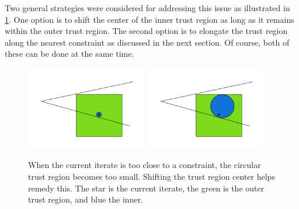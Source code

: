 Two general strategies were considered for addressing this issue as illustrated in \cref{options_basis}.
One option is to shift the center of the inner trust region as long as it remains within the outer trust region.
The second option is to elongate the trust region along the nearest constraint as discussed in the next section.
Of course, both of these can be done at the same time.


\begin{figure}[ht]
    \centering
    \includegraphics[width=200px]{images/small_circle.png}
    \includegraphics[width=200px]{images/shifted_center.png}
    \caption[The advantage of not requiring the sample region center to be the trust region center.]{
    	When the current iterate is too close to a constraint, the circular trust region becomes too small.
    	Shifting the trust region center helps remedy this.
    	The star is the current iterate, the green is the outer trust region, and blue the inner.
    }
    \label{options_basis}
\end{figure}


